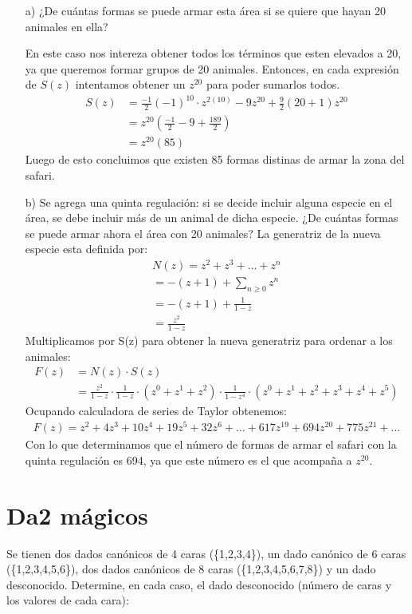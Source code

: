 \documentclass[spanish, fleqn]{article}
\begin{document}
    \begin{enumerate}
    \item[a)] ¿De cuántas formas se puede armar esta área si se quiere que hayan 20 animales en ella?
    
    En este caso nos intereza obtener todos los términos que esten elevados a 20, ya que queremos formar grupos de 20 animales. Entonces, en cada expresión de $S(z)$ intentamos obtener un $z^20$ para poder sumarlos todos.
    \begin{align*}
    S(z)&=\frac{-1}{2}(-1)^{10} \cdot z^{2(10)}- 9z^{20}+\frac{9}{2}(20+1)z^{20}\\
    &=z^{20}(\frac{-1}{2}-9+\frac{189}{2})\\
    &=z^{20}(85)
    \end{align*}
    Luego de esto concluimos que existen 85 formas distinas de armar la zona del safari.
    
    \item[b)] Se agrega una quinta regulación: si se decide incluir alguna especie en el área, se debe incluir más de un animal de dicha especie. ¿De cuántas formas se puede armar ahora el área con 20 animales?
    La generatriz de la nueva especie esta definida por:
    \begin{align*}
    N(z)=z^2+z^3+ \dots +z^n \\
    = -(z+1) + \sum_{n \geqslant 0} z^n\\
    =-(z+1)+\frac{1}{1-z}\\
    =\frac{z^2}{1-z}
    \end{align*}
    Multiplicamos por S(z) para obtener la nueva generatriz para ordenar a los animales:
    \begin{align*}
    F(z)&=N(z) \cdot S(z)\\
    	&=\frac{z^2}{1-z} \cdot \frac{1}{1-z} \cdot (z^0+z^1+z^2) \cdot \frac{1}{1-z^4} \cdot (z^0+z^1+z^2+z^3+z^4+z^5) 
    \end{align*}
    Ocupando calculadora de series de Taylor obtenemos:
    \begin{align*}
    F(z)=z^2+4z^3+10z^4+19z^5+32z^6+ \dots + 617z^{19} + 694z^{20}+775z^21+ \dots
	\end{align*}
	Con lo que determinamos que el número de formas de armar el safari con la quinta regulación es 694, ya que este número es el que acompaña a $z^20$.
    \end{enumerate}
	
	\section{Da2 mágicos}
    Se tienen dos dados canónicos de 4 caras (\{1,2,3,4\}), un dado canónico de 6 caras (\{1,2,3,4,5,6\}), dos dados canónicos de 8 caras (\{1,2,3,4,5,6,7,8\}) y un dado desconocido. Determine, en cada caso, el dado desconocido (número de caras y los valores de cada cara):
    
\end{document}
